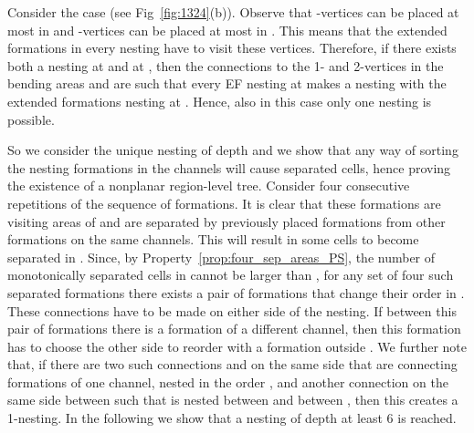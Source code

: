 \documentclass[a4paper,10pt]{llncs}
\newcounter{prop}
\renewenvironment{proof}
{{\bf Proof:}}{\hspace*{\fill}\par\vspace{2mm}}
\begin{document}
\begin{proof}
Consider the case  (see Fig~\ref{fig:1324}(b)). Observe that -vertices can be placed at most in  and -vertices can be placed at most in . This means that the extended formations in every nesting have to visit these vertices. Therefore, if there exists both a nesting at  and at , then the connections to the 1- and 2-vertices in the bending areas  and  are such that every EF nesting at  makes a nesting with the extended formations nesting at . Hence, also in this case only one nesting is possible.

So we consider the unique nesting of depth  and we show that any way of sorting the nesting formations in the channels will cause separated cells, hence proving the existence of a nonplanar region-level tree.
Consider four consecutive repetitions of the sequence of formations. It is clear that these formations are visiting areas of  and are separated by previously placed formations from other formations on the same channels. This will result in some cells to become separated in . Since, by Property~\ref{prop:four_sep_areas_PS}, the number of monotonically separated cells in  cannot be larger than , for any set of four such separated formations there exists a pair of formations  that change their order in . These connections have to be made on either side of the nesting. If between this pair of formations there is a formation of a different channel, then this formation has to choose the other side to reorder with a formation outside . We further note that, if there are two such connections  and  on the same side that are connecting formations of one channel, nested in the order , and another connection on the same side between  such that  is nested between  and  between , then this creates a 1-nesting. In the following we show that a nesting of depth at least 6 is reached.


\end{proof}
\end{document}
